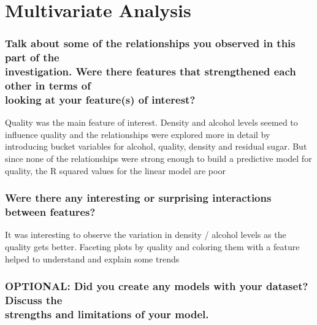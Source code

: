\documentclass[]{article}
\begin{document}
\section{Multivariate Analysis}\label{multivariate-analysis}

\subsubsection{\texorpdfstring{Talk about some of the relationships you
observed in this part of the\\
investigation. Were there features that strengthened each other in terms
of\\
looking at your feature(s) of
interest?}{Talk about some of the relationships you observed in this part of the investigation. Were there features that strengthened each other in terms of looking at your feature(s) of interest?}}\label{talk-about-some-of-the-relationships-you-observed-in-this-part-of-the-investigation.-were-there-features-that-strengthened-each-other-in-terms-of-looking-at-your-features-of-interest}

Quality was the main feature of interest. Density and alcohol levels
seemed to influence quality and the relationships were explored more in
detail by introducing bucket variables for alcohol, quality, density and
residual sugar. But since none of the relationships were strong enough
to build a predictive model for quality, the R squared values for the
linear model are poor

\subsubsection{Were there any interesting or surprising interactions
between
features?}\label{were-there-any-interesting-or-surprising-interactions-between-features}

It was interesting to observe the variation in density / alcohol levels
as the quality gets better. Faceting plots by quality and coloring them
with a feature helped to understand and explain some trends

\subsubsection{\texorpdfstring{OPTIONAL: Did you create any models with
your dataset? Discuss the\\
strengths and limitations of your
model.}{OPTIONAL: Did you create any models with your dataset? Discuss the strengths and limitations of your model.}}\label{optional-did-you-create-any-models-with-your-dataset-discuss-the-strengths-and-limitations-of-your-model.}
\end{document}
